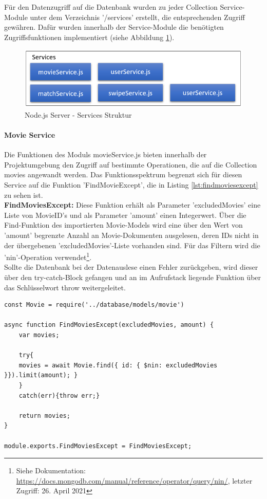 Für den Datenzugriff auf die Datenbank wurden zu jeder Collection Service-Module unter dem Verzeichnis '/services' erstellt, die entsprechenden Zugriff gewähren. Dafür wurden innerhalb der Service-Module die benötigten Zugriffsfunktionen implementiert (siehe Abbildung \ref{fig:node_service_structure}).

\begin{figure}[tbt]
\centering
\includegraphics[width=12cm]{images/serviceStruktur.PNG}
\caption{Node.js Server - Services Struktur}
\label{fig:node_service_structure}
\end{figure}


%
%

\paragraph{Movie Service}
Die Funktionen des Moduls movieService.js bieten innerhalb der Projektumgebung den Zugriff auf bestimmte Operationen, die auf die Collection movies angewandt werden. Das Funktionsspektrum begrenzt sich für diesen Service auf die Funktion 'FindMovieExcept', die in Listing \ref{lst:findmoviesexcept} zu sehen ist.\\

\noindent
\textbf{FindMoviesExcept:}
Diese Funktion erhält als Parameter 'excludedMovies' eine Liste von MovieID's und als Parameter 'amount' einen Integerwert.
Über die Find-Funktion des importierten Movie-Models wird eine über den Wert von 'amount' begrenzte Anzahl an Movie-Dokumenten ausgelesen, deren IDs nicht in der übergebenen 'excludedMovies'-Liste vorhanden sind. Für das Filtern wird die 'nin'-Operation verwendet\footnote{Siehe Dokumentation: \url{https://docs.mongodb.com/manual/reference/operator/query/nin/}, letzter Zugriff: 26. April 2021}.\\
Sollte die Datenbank bei der Datenauslese einen Fehler zurückgeben, wird dieser über den try-catch-Block gefangen und an im Aufrufstack liegende Funktion über das Schlüsselwort throw weitergeleitet.\\

\begin{lstlisting}[caption=movieService.js - FindMoviesExcept, label=lst:findmoviesexcept]
const Movie = require('../database/models/movie')

async function FindMoviesExcept(excludedMovies, amount) {
    var movies;

    try{ 
    movies = await Movie.find({ id: { $nin: excludedMovies }}).limit(amount); }
    }
    catch(err){throw err;}

    return movies;
}

module.exports.FindMoviesExcept = FindMoviesExcept;
\end{lstlisting}


